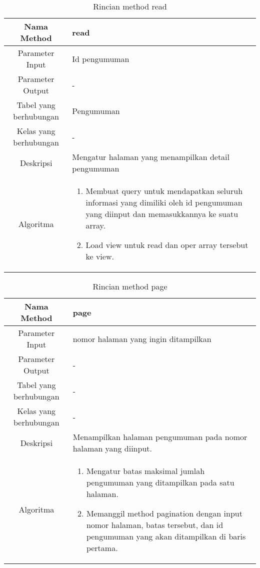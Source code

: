 \begin{center}
	\begin{table}[H]
	\caption{Rincian method read}
	\label{table:pengumuman-read}
\begin{tabular}{|c|p{11cm}|}
\hline
Nama Method 	& 	 read	\\
\hline
Parameter Input & Id pengumuman \\
\hline
Parameter Output & - \\
\hline
Tabel yang berhubungan & Pengumuman \\
\hline
Kelas yang berhubungan & - \\
\hline
Deskripsi	& Mengatur halaman yang menampilkan detail pengumuman\\
\hline
Algoritma	& \begin{enumerate}
				\item Membuat query untuk mendapatkan seluruh informasi yang dimiliki oleh id pengumuman yang diinput dan memasukkannya ke suatu array.
				\item Load view untuk read dan oper array tersebut ke view.
				\end{enumerate} \\
\hline
\end{tabular}
\end{table}
\end{center}

\begin{center}
	\begin{table}[H]
	\caption{Rincian method page}
	\label{table:pengumuman-page}
\begin{tabular}{|c|p{11cm}|}
\hline
Nama Method 	& 	 page	\\
\hline
Parameter Input & nomor halaman yang ingin ditampilkan \\
\hline
Parameter Output & - \\
\hline
Tabel yang berhubungan & -\\
\hline
Kelas yang berhubungan & - \\
\hline
Deskripsi	& Menampilkan halaman pengumuman pada nomor halaman yang diinput.\\
\hline
Algoritma	& \begin{enumerate}
				\item Mengatur batas maksimal jumlah pengumuman yang ditampilkan pada satu halaman.
				\item Memanggil method pagination dengan input nomor halaman, batas tersebut, dan id pengumuman yang akan ditampilkan di baris pertama.
				\end{enumerate} \\
\hline
\end{tabular}
\end{table}
\end{center}


